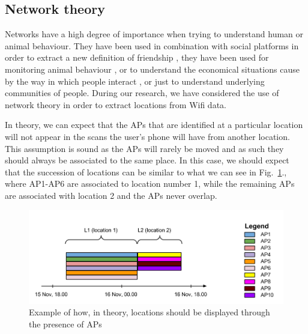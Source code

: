 \subsection{Network theory}

Networks have a high degree of importance when trying to understand human or
animal behaviour. They have been used in combination with social platforms in
order to extract a new definition of friendship \cite{cho2011friendship}, they
have been used for monitoring animal behaviour \cite{4116628}, or to understand
the economical situations cause by the way in which people interact
\cite{Copic05identifyingcommunity}, or just to understand underlying communities
of people. During our research, we have considered the use of network theory in
order to extract locations from Wifi data.

In theory, we can expect that the APs that are identified at a particular
location will not appear in the scans the user's phone will have from another
location. This assumption is sound as the APs will rarely be moved and as such
they should always be associated to the same place. In this case, we should
expect that the succession of locations can be similar to what we can see in
Fig.~\ref{user_6_tn}., where AP1-AP6 are associated to location number 1, while
the remaining APs are associated with location 2 and the APs never overlap.

\begin{figure}[!h]
\centering
\includegraphics[width=1\textwidth]{figures/networks/theoretical_network.png}
\caption{Example of how, in theory, locations should be displayed through the
presence of APs}
\label{user_6_tn}
\end{figure}


